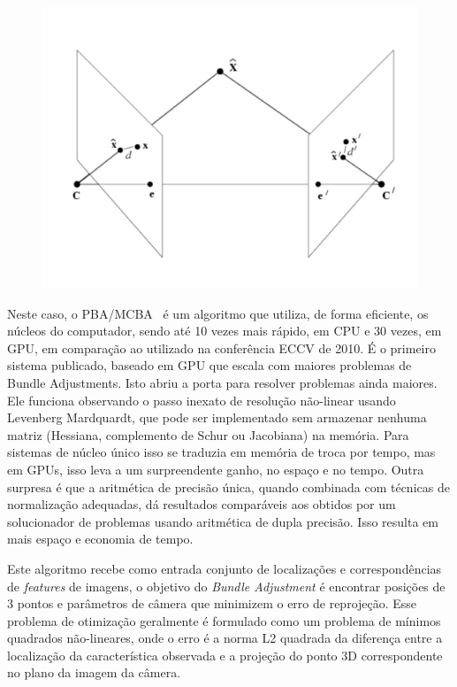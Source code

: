 \begin{itemize}
\begin{figure}[!h]
	\centering
	\includegraphics[width=0.5\linewidth]{figs/bundleAdjustment.png}
	\caption{
	}\label{fig:bundleAdjustment}
\end{figure}

Neste caso, o PBA/MCBA~\cite{furukawa2009accurate,wu2011multicore} é um algoritmo que utiliza, de forma eficiente, os núcleos do computador, sendo até 10 vezes mais rápido, em CPU e 30 vezes, em GPU, em comparação ao utilizado na conferência ECCV de 2010. É o primeiro sistema publicado, baseado em GPU que escala com maiores problemas de Bundle Adjustments. Isto abriu a porta para resolver problemas ainda maiores. Ele funciona observando o passo inexato de resolução não-linear usando Levenberg Mardquardt, que pode ser implementado sem armazenar nenhuma matriz (Hessiana, complemento de Schur ou Jacobiana) na memória. Para sistemas de núcleo único isso se traduzia em memória de troca por tempo, mas em GPUs, isso leva a um surpreendente ganho, no espaço e no tempo. Outra surpresa é que a aritmética de precisão única, quando combinada com técnicas de normalização adequadas, dá resultados comparáveis aos obtidos por um solucionador de problemas usando aritmética de dupla precisão. Isso resulta em mais espaço e economia de tempo.

Este algoritmo recebe como entrada conjunto de localizações e correspondências de \emph{features} de imagens, o objetivo do \emph{Bundle Adjustment} é encontrar posições de 3 pontos e parâmetros de câmera que minimizem o erro de reprojeção. Esse problema de otimização geralmente é formulado como um problema de mínimos quadrados não-lineares, onde o erro é a norma L2 quadrada da diferença entre a localização da característica observada e a projeção do ponto 3D correspondente no plano da imagem da câmera.


\end{itemize}
